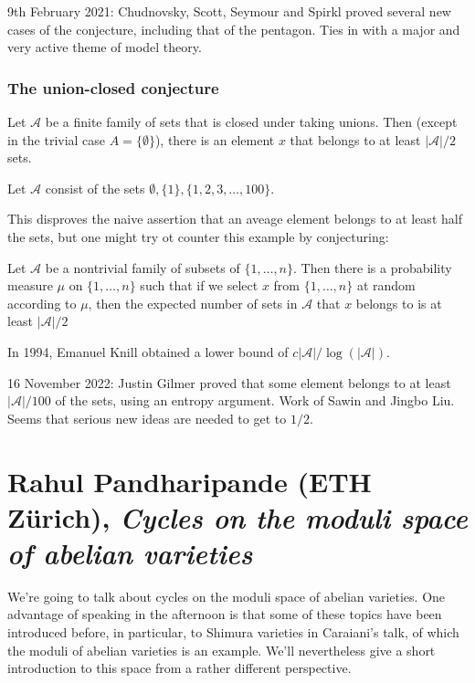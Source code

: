 \documentclass[reqno]{amsart} 
\begin{document}
9th February 2021: Chudnovsky, Scott, Seymour and Spirkl proved several new cases of the conjecture, including that of the pentagon.  Ties in with a major and very active theme of model theory.

\section{The union-closed conjecture}

\begin{conjecture}[Frankl, 1979] Let $\mathcal{A}$ be a finite family of sets that is closed under taking unions.  Then (except in the trivial case $A = \{\emptyset\}$), there is an element $x$ that belongs to at least $\lvert \mathcal{A} \rvert / 2$ sets.  
\end{conjecture}
\begin{example}
  Let $\mathcal{A}$ consist of the sets $\emptyset, \{1\}, \{1, 2, 3, \dotsc, 100\}$.
\end{example}
This disproves the naive assertion that an aveage element belongs to at least half the sets, but one might try ot counter this example by conjecturing:
\begin{conjecture}
  Let $\mathcal{A}$ be a nontrivial family of subsets of $\{1, \dotsc, n\}$.  Then there is a probability measure $\mu$ on $\{1, \dotsc, n\}$ such that if we select $x$ from $\{1, \dotsc, n\}$ at random according to $\mu$, then the expected number of sets in $\mathcal{A}$ that $x$ belongs to is at least $\lvert \mathcal{A} \rvert / 2$
\end{conjecture}

In 1994, Emanuel Knill obtained a lower bound of $c \lvert \mathcal{A} \rvert / \log(\lvert \mathcal{A} \rvert)$.

16 November 2022: Justin Gilmer proved that some element belongs to at least $\lvert \mathcal{A} \rvert/100$ of the sets, using an entropy argument.  Work of Sawin and Jingbo Liu.  Seems that serious new ideas are needed to get to $1/2$.


\part{Rahul Pandharipande (ETH Zürich), \emph{Cycles on the moduli space of abelian varieties}}

We're going to talk about cycles on the moduli space of abelian varieties.  One advantage of speaking in the afternoon is that some of these topics have been introduced before, in particular, to Shimura varieties in Caraiani's talk, of which the moduli of abelian varieties is an example.  We'll nevertheless give a short introduction to this space from a rather different perspective.
\end{document}
